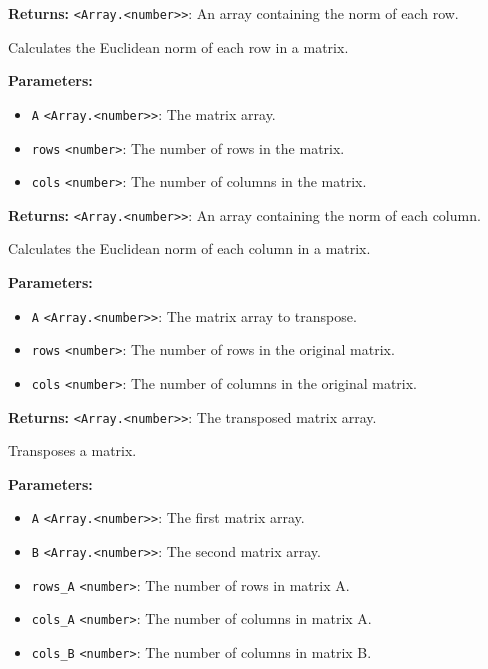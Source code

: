 \documentclass[12pt,a4paper]{article}
\begin{document}
\noindent \textbf{Returns:} \texttt{<Array.<number>>}: An array containing the norm of each row.

\noindent Calculates the Euclidean norm of each row in a matrix.

\vspace{5mm}
\noindent {}


\noindent \textbf{Parameters:}
\begin{itemize}
  \item \texttt{A} \texttt{<Array.<number>>}: The matrix array.
  \item \texttt{rows} \texttt{<number>}: The number of rows in the matrix.
  \item \texttt{cols} \texttt{<number>}: The number of columns in the matrix.
\end{itemize}

\noindent \textbf{Returns:} \texttt{<Array.<number>>}: An array containing the norm of each column.

\noindent Calculates the Euclidean norm of each column in a matrix.

\vspace{5mm}
\noindent {}


\noindent \textbf{Parameters:}
\begin{itemize}
  \item \texttt{A} \texttt{<Array.<number>>}: The matrix array to transpose.
  \item \texttt{rows} \texttt{<number>}: The number of rows in the original matrix.
  \item \texttt{cols} \texttt{<number>}: The number of columns in the original matrix.
\end{itemize}

\noindent \textbf{Returns:} \texttt{<Array.<number>>}: The transposed matrix array.

\noindent Transposes a matrix.

\vspace{5mm}
\noindent {}


\noindent \textbf{Parameters:}
\begin{itemize}
  \item \texttt{A} \texttt{<Array.<number>>}: The first matrix array.
  \item \texttt{B} \texttt{<Array.<number>>}: The second matrix array.
  \item \texttt{rows\_A} \texttt{<number>}: The number of rows in matrix A.
  \item \texttt{cols\_A} \texttt{<number>}: The number of columns in matrix A.
  \item \texttt{cols\_B} \texttt{<number>}: The number of columns in matrix B.
\end{itemize}
\end{document}
